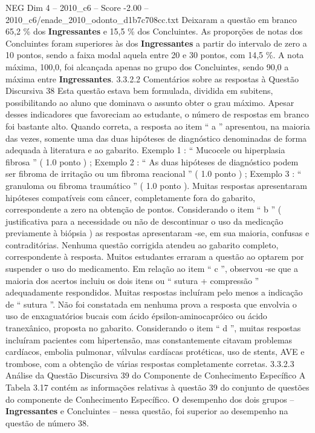 \begin{textsample}{NEG Dim 4 – 2010\_c6 – Score -2.00 – 2010\_c6/enade\_2010\_odonto\_d1b7c708cc.txt}
Deixaram a questão em branco 65,2 \% dos \textbf{Ingressantes} e 15,5 \% dos Concluintes.
As proporções de notas dos Concluintes foram superiores às dos \textbf{Ingressantes} a partir do intervalo de zero a 10 pontos, sendo a faixa modal aquela entre 20 e 30 pontos, com 14,5 \%.
A nota máxima, 100,0, foi alcançada apenas no grupo dos Concluintes, sendo 90,0 a máxima entre \textbf{Ingressantes}. 3.3.2.2 Comentários sobre as respostas à Questão Discursiva 38 Esta questão estava bem formulada, dividida em subitens, possibilitando ao aluno que dominava o assunto obter o grau máximo.
Apesar desses indicadores que favoreciam ao estudante, o número de respostas em branco foi bastante alto.
Quando correta, a resposta ao item “ a ” apresentou, na maioria das vezes, somente uma das duas hipóteses de diagnóstico denominadas de forma adequada à literatura e ao gabarito.
Exemplo 1 : “ Mucocele ou hiperplasia fibrosa ” ( 1.0 ponto ) ; Exemplo 2 : “ As duas hipóteses de diagnóstico podem ser fibroma de irritação ou um fibroma reacional ” ( 1.0 ponto ) ; Exemplo 3 : “ granuloma ou fibroma traumático ” ( 1.0 ponto ).
Muitas respostas apresentaram hipóteses compatíveis com câncer, completamente fora do gabarito, correspondente a zero na obtenção de pontos.
Considerando o item “ b ” ( justificativa para a necessidade ou não de descontinuar o uso da medicação previamente à biópsia ) as respostas apresentaram -se, em sua maioria, confusas e contraditórias.
Nenhuma questão corrigida atendeu ao gabarito completo, correspondente à resposta.
Muitos estudantes erraram a questão ao optarem por suspender o uso do medicamento.
Em relação ao item “ c ”, observou -se que a maioria dos acertos incluiu os dois itens ou “ sutura + compressão ” adequadamente respondidos.
Muitas respostas incluíram pelo menos a indicação de “ sutura ”.
Não foi constatada em nenhuma prova a resposta que envolvia o uso de enxaguatórios bucais com ácido épsilon-aminocapróico ou ácido tranexânico, proposta no gabarito.
Considerando o item “ d ”, muitas respostas incluíram pacientes com hipertensão, mas constantemente citavam problemas cardíacos, embolia pulmonar, válvulas cardíacas protéticas, uso de stents, AVE e trombose, com a obtenção de várias respostas completamente corretas. 3.3.2.3 Análise da Questão Discursiva 39 do Componente de Conhecimento Específico A Tabela 3.17 contém as informações relativas à questão 39 do conjunto de questões do componente de Conhecimento Específico.
O desempenho dos dois grupos – \textbf{Ingressantes} e Concluintes – nessa questão, foi superior ao desempenho na questão de número 38.

\end{textsample}

